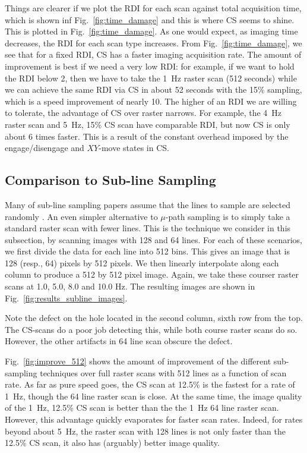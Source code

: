 \documentclass[twocolumn,oneside]{IEEEtran/IEEEtran}
\begin{document}
Things are clearer if we plot the RDI for each scan against total acquisition time, which is
shown inf Fig.~\ref{fig:time_damage} and 
this is where CS seems to shine.
This is plotted in Fig.~\ref{fig:time_damage}.
As one would expect, as imaging time decreases, the RDI for each
scan type increases. 
From Fig.~\ref{fig:time_damage}, we see that for a
fixed RDI, CS has a faster imaging acquisition rate. The amount of
improvement is best if we need a very low RDI: for example, if we want
to hold the RDI below 2, then we have to take the 1~Hz raster scan
(512 seconds) while we can achieve the same RDI via CS in about 52
seconds with the 15\% sampling, which is a speed improvement of nearly
10. The higher of an RDI we are willing to tolerate, the advantage of
CS over raster narrows. For example, the 4~Hz raster scan and 5~Hz,
15\% CS scan have comparable RDI, but now CS is only about 6 times
faster. This is a result of the constant overhead imposed by the
engage/disengage and $XY$-move states in CS.

\subsection{Comparison to Sub-line Sampling} \label{sec:cp_subline}
 Many of sub-line sampling papers assume
that the lines to sample are selected randomly \cite{han_optimal_2018,
  Luo_nano_2015}. An even simpler alternative to
$\mu$-path sampling is to simply 
take a standard raster scan with fewer lines. This is the technique we
consider in this subsection, by scanning images with 
 128 and 64 lines. For each of these scenarios, we first divide the data
for each line into 512 bins. This gives an image that is 128 (resp.,
64) pixels by 512 pixels. We then linearly interpolate along each
column to produce a 512 by 512 pixel image. Again, we take these
courser raster scans at 1.0, 5.0, 8.0 and 10.0 Hz. The resulting
images are shown in Fig.~\ref{fig:results_subline_images}.

Note the defect on the hole located in the second column, sixth row
from the top. The CS-scans do a poor job detecting this, while both
course raster scans do so. However, the other artifacts in 64 line
scan obscure the defect.

Fig.~\ref{fig:improve_512} shows the amount of improvement of the
different sub-sampling techniques over full raster scans with 512
lines as a function of scan rate. As far as pure speed goes, the CS
scan at 12.5\% is the fastest for a rate of 1~Hz, though the 64 line
raster scan is close. At the same time, the image quality of the 1~Hz,
12.5\% CS scan is better than the the 1~Hz 64 line raster scan.
However, this advantage quickly evaporates for faster scan rates.
Indeed, for rates beyond about 5~Hz, the raster scan with 128 lines is
not only faster than the 12.5\% CS scan, it also has (arguably) better
image quality.
\end{document}
